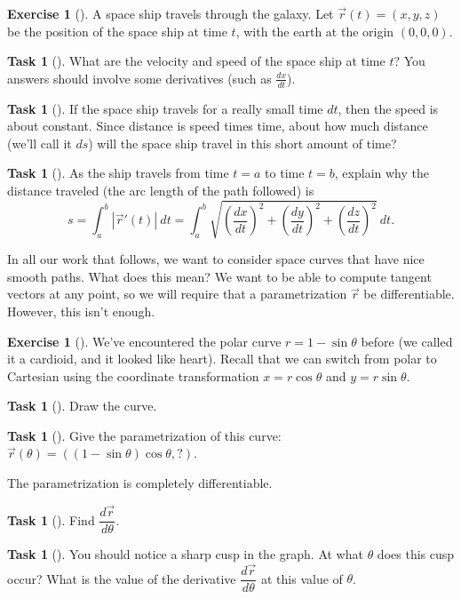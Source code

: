 \documentclass[10pt,]{book}
\theoremstyle{plain}
\theoremstyle{definition}
\theoremstyle{definition}
\theoremstyle{definition}
\theoremstyle{definition}
\newtheorem{exploration}[project]{Exercise}
\newtheorem{task}[project]{Task}
\theoremstyle{definition}
\numberwithin{equation}{section}
\begin{document}
\begin{exploration}[]\label{exploration-164}
A space ship travels through the galaxy. Let \(\vec r(t) = (x,y,z)\) be the position of the space ship at time \(t\), with the earth at the origin \((0,0,0)\).%
\begin{task}[]\label{task-379}
What are the velocity and speed of the space ship at time \(t\)? You answers should involve some derivatives (such as \(\frac{dx}{dt}\)).%
\end{task}
\begin{task}[]\label{task-380}
If the space ship travels for a really small time \(dt\), then the speed is about constant. Since distance is speed times time, about how much distance (we'll call it \(ds\)) will the space ship travel in this short amount of time?%
\end{task}
\begin{task}[]\label{arc_length2}
As the ship travels from time \(t=a\) to time \(t=b\), explain why the distance traveled (the arc length of the path followed) is%
\begin{equation*}
s=\int_a^b |\vec r '(t)|\ dt = \int_a^b \sqrt{\left(\frac{dx}{dt}\right)^2+\left(\frac{dy}{dt}\right)^2+\left(\frac{dz}{dt}\right)^2}\ dt .
\end{equation*}
%
\end{task}
\end{exploration}
In all our work that follows, we want to consider space curves that have nice smooth paths. What does this mean? We want to be able to compute tangent vectors at any point, so we will require that a parametrization \(\vec r\) be differentiable. However, this isn't enough.%
\begin{exploration}[]\label{exploration-165}
We've encountered the polar curve \(r = 1-\sin\theta\) before (we called it a cardioid, and it looked like heart). Recall that we can switch from polar to Cartesian using the coordinate transformation \(x=r\cos\theta\) and \(y=r\sin\theta\).%
\begin{task}[]\label{task-382}
Draw the curve.%
\end{task}
\begin{task}[]\label{task-383}
Give the parametrization of this curve: \(\vec r(\theta) = ((1-\sin\theta)\cos\theta, ?)\).%
\end{task}
The parametrization is completely differentiable.%
\begin{task}[]\label{task-384}
Find \(\dfrac{d\vec r}{d\theta}\).%
\end{task}
\begin{task}[]\label{task-385}
You should notice a sharp cusp in the graph. At what \(\theta\) does this cusp occur?  What is the value of the derivative \(\dfrac{d\vec r}{d\theta}\) at this value of \(\theta\).%
\end{task}
\end{exploration}
\end{document}
